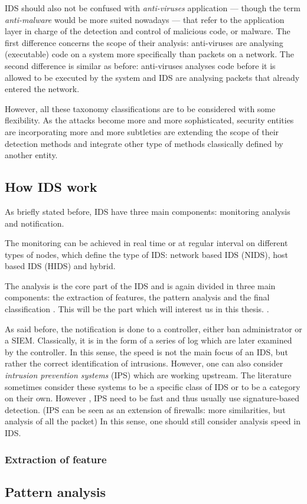 IDS should also not be confused with \emph{anti-viruses} application --- though the term \emph{anti-malware} would be more suited nowadays --- that refer to the application layer in charge of the detection and control of malicious code, or malware. The first difference concerns the scope of their analysis: anti-viruses are analysing (executable) code on a system more specifically than packets on a network. The second difference is similar as before: anti-viruses analyses code before it is allowed to be executed by the system and IDS are analysing packets that already entered the network.

However, all these taxonomy classifications are to be considered with some flexibility. As the attacks become more and more sophisticated, security entities are incorporating more and more subtleties are extending the scope of their detection methods and integrate other type of methods classically defined by another entity. 

\subsection{How IDS work}
As briefly stated before, IDS have three main components: monitoring analysis and notification. 

The monitoring can be achieved in real time or at regular interval on different types of nodes, which define the type of IDS: network based IDS (NIDS), host based IDS (HIDS) and hybrid. 

The analysis is the core part of the IDS and is again divided in three main components: the extraction of features, the pattern analysis and the final classification \cite{Winter2018}. This will be the part which will interest us in this thesis. .

As said before, the notification is done to a controller, either ban administrator or a SIEM. Classically, it is in the form of a series of log which are later examined by the controller. In this sense, the speed is not the main focus of an IDS, but rather the correct identification of intrusions. However, one can also consider \emph{intrusion prevention systems} (IPS) which are working upstream. The literature sometimes consider these systems to be a specific class of IDS or to be a category on their own. However , IPS need to be fast and thus usually use signature-based detection. (IPS can be seen as an extension of firewalls: more similarities, but analysis of all the packet) In this sense, one should still consider analysis speed in IDS.

\subsubsection{Extraction of feature}


\subsection{Pattern analysis}


\FloatBarrier